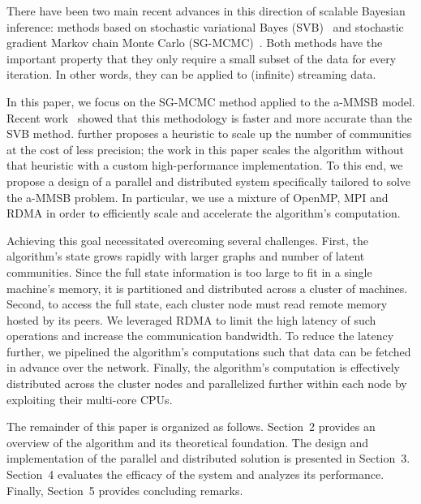 There have been two main recent advances in this direction of scalable Bayesian inference: methods based on stochastic variational Bayes (SVB)~\cite{gopalan2012scalable,hoffman2013stochastic,gopalan2013efficient} and stochastic gradient Markov chain Monte Carlo (SG-MCMC)~\cite{welling2011bayesian,patterson2013stochastic,ahn2014distributed,ahn2012bayesian}. Both methods have the important property that they only require a small subset of the data for every iteration. In other words, they can be applied to (infinite) streaming data.

In this paper, we focus on the SG-MCMC method applied to the a-MMSB model. Recent work~\cite{LiAW15} showed that this methodology is faster and more accurate than the SVB method. \cite{LiAW15} further proposes a heuristic to scale up the number of communities at the cost of less precision; the work in this paper scales the algorithm without that heuristic with a custom high-performance implementation. To this end, we propose a design of a parallel and distributed system specifically tailored to solve the a-MMSB problem. In particular, we use a mixture of OpenMP, MPI and RDMA in order to efficiently scale and accelerate the algorithm's computation.

Achieving this goal necessitated overcoming several challenges. First, the algorithm's state grows rapidly with larger graphs and number of latent communities. Since the full state information is too large to fit in a single machine's memory, it is partitioned and distributed across a cluster of machines. Second, to access the full state, each cluster node must read remote memory hosted by its peers. We leveraged RDMA to limit the high latency of such operations and increase the communication bandwidth. To reduce the latency further, we pipelined the algorithm's computations such that data can be fetched in advance over the network. Finally, the algorithm's computation is effectively distributed across the cluster nodes and parallelized further within each node by exploiting their multi-core CPUs.

The remainder of this paper is organized as follows. Section~2 provides an overview of the algorithm and its theoretical foundation. The design and implementation of the parallel and distributed solution is presented in Section~3. Section~4 evaluates the efficacy of the system and analyzes its performance. Finally, Section~5 provides concluding remarks.



